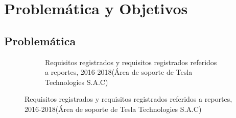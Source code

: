 \chapter{Problemática y Objetivos} \label{chapter:I}
\section{Problem\'{a}tica}
\begin{spacing}{1.5}
	\begin{figure}[h]\label{figure:chaperI_1}
		\begin{center}
		\begin{figure}[H]\label{figure:chaperI_1}
			\begin{center}
			\end{center}
			\caption {\centering \small{Requisitos registrados y requisitos registrados referidos a reportes,  2016-2018(\'{A}rea de soporte de Tesla Technologies S.A.C)}} 
		\end{figure}
		\end{center}
		\caption {\centering \small{Requisitos registrados y requisitos registrados referidos a reportes,  2016-2018(\'{A}rea de soporte de Tesla Technologies S.A.C)}} 
	\end{figure} 


\end{spacing}
